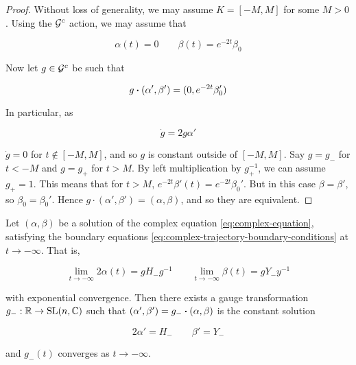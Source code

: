 \documentclass{report}
\begin{document}
\begin{proof}
    Without loss of generality, we may assume \(K = [-M, M]\) for some \(M > 0\). Using the \(\mathcal{G}^c\) action, we may assume that

    \[\alpha(t) = 0 \qquad \beta(t) = e^{-2t}\beta_0\]

    Now let \(g \in \mathcal{G}^c\) be such that

    \[g \vdot (\alpha', \beta') = (0, e^{-2t}\beta_0')\]

    In particular, as

    \[\dot g = 2g\alpha'\]

    \(\dot g = 0\) for \(t \notin [-M, M]\), and so \(g\) is constant outside of \([-M, M]\). Say \(g = g_-\) for \(t < -M\) and \(g = g_+\) for \(t > M\). By left multiplication by \(g_+^{-1}\), we can assume \(g_+ = 1\). This means that for \(t > M\), \(e^{-2t}\beta'(t) = e^{-2t}\beta_0'\). But in this case \(\beta = \beta'\), so \(\beta_0 = \beta_0'\). Hence \(g \cdot (\alpha', \beta') = (\alpha, \beta)\), and so they are equivalent.
\end{proof}

\begin{lemma}
    \label{lem:complex-trajectory-convergence-negative}

    Let \((\alpha, \beta)\) be a solution of the complex equation \cref{eq:complex-equation}, satisfying the boundary equations \cref{eq:complex-trajectory-boundary-conditions} at \(t \to -\infty\). That is,

    \[\lim_{t\to-\infty}2\alpha(t) = gH_-g^{-1} \qquad \lim_{t \to -\infty}\beta(t) = gY_-y^{-1}\]

    with exponential convergence. Then there exists a gauge transformation \(g_- : \mathbb{R} \to \operatorname{SL}(n, \mathbb{C})\) such that \((\alpha', \beta') = g_-\vdot(\alpha, \beta)\) is the constant solution

    \[2\alpha' = H_- \qquad \beta' = Y_-\]

    and \(g_-(t)\) converges as \(t \to -\infty\).
\end{lemma}
\end{document}
